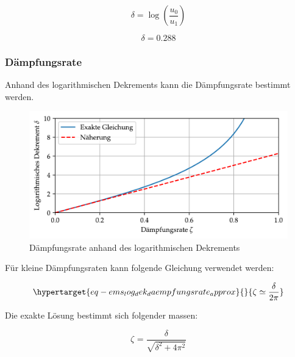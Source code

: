 \documentclass[
  letterpaper,
  DIV=11]{scrreprt}
\begin{document}
\begin{equation}\delta = \log{\left(\frac{u_{0}}{u_{1}} \right)}\end{equation}

\begin{equation}\delta = 0.288\end{equation}

\hypertarget{duxe4mpfungsrate}{%
\subsubsection{Dämpfungsrate}\label{duxe4mpfungsrate}}

Anhand des logarithmischen Dekrements kann die Dämpfungsrate bestimmt
werden.

\begin{figure}[H]

{\centering \includegraphics{index_files/mediabag/ems_01_files/figure-pdf/fig-ems_log_dek_daempfungsrate-output-1.pdf}

}

\caption{\label{fig-ems_log_dek_daempfungsrate}Dämpfungsrate anhand des
logarithmischen Dekrements}

\end{figure}

Für kleine Dämpfungsraten kann folgende Gleichung verwendet werden:

\begin{equation}\protect\hypertarget{eq-ems_log_dek_daempfungsrate_approx}{}{
\zeta \simeq \frac{\delta}{2\pi}
}\label{eq-ems_log_dek_daempfungsrate_approx}\end{equation}

Die exakte Lösung bestimmt sich folgender massen:

\begin{equation}\zeta_{} = \frac{\delta}{\sqrt{\delta^{2} + 4 \pi^{2}}}\end{equation}
\end{document}
